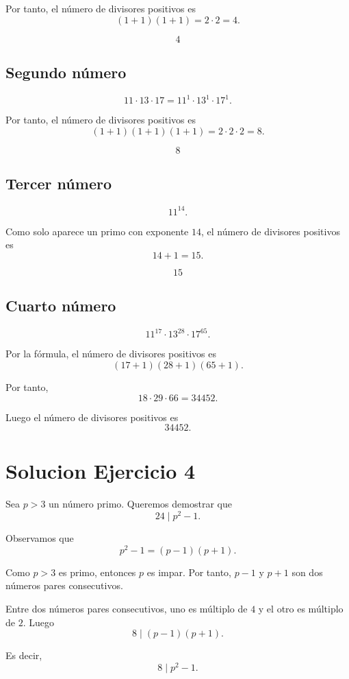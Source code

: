 \documentclass[12pt]{article}
\begin{document}
Por tanto, el número de divisores positivos es
\[
(1+1)(1+1)=2\cdot 2=4.
\]

\[
\boxed{4}
\]

\subsection*{Segundo número}

\[
11\cdot 13\cdot 17 = 11^1\cdot 13^1\cdot 17^1.
\]

Por tanto, el número de divisores positivos es
\[
(1+1)(1+1)(1+1)=2\cdot 2\cdot 2=8.
\]

\[
\boxed{8}
\]

\subsection*{Tercer número}

\[
11^{14}.
\]

Como solo aparece un primo con exponente \(14\), el número de divisores positivos es
\[
14+1=15.
\]

\[
\boxed{15}
\]

\subsection*{Cuarto número}

\[
11^{17}\cdot 13^{28}\cdot 17^{65}.
\]

Por la fórmula, el número de divisores positivos es
\[
(17+1)(28+1)(65+1).
\]

Por tanto,
\[
18\cdot 29\cdot 66=34452.
\]

Luego el número de divisores positivos es
\[
\boxed{34452}.
\]

\section*{Solucion Ejercicio 4}

Sea \(p>3\) un número primo. Queremos demostrar que
\[
24 \mid p^2-1.
\]

Observamos que
\[
p^2-1=(p-1)(p+1).
\]

Como \(p>3\) es primo, entonces \(p\) es impar. Por tanto, \(p-1\) y \(p+1\) son dos números pares consecutivos.

Entre dos números pares consecutivos, uno es múltiplo de \(4\) y el otro es múltiplo de \(2\). Luego
\[
8 \mid (p-1)(p+1).
\]

Es decir,
\[
8 \mid p^2-1.
\]
\end{document}
